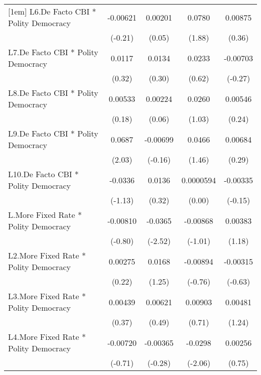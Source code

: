 {\begin{longtable}{l*{4}{c}}
[1em]
L6.De Facto CBI * Polity Democracy& -0.00621         &  0.00201         &   0.0780         &  0.00875         \\
                &  (-0.21)         &   (0.05)         &   (1.88)         &   (0.36)         \\
[1em]
L7.De Facto CBI * Polity Democracy&   0.0117         &   0.0134         &   0.0233         & -0.00703         \\
                &   (0.32)         &   (0.30)         &   (0.62)         &  (-0.27)         \\
[1em]
L8.De Facto CBI * Polity Democracy&  0.00533         &  0.00224         &   0.0260         &  0.00546         \\
                &   (0.18)         &   (0.06)         &   (1.03)         &   (0.24)         \\
[1em]
L9.De Facto CBI * Polity Democracy&   0.0687\sym{*}  & -0.00699         &   0.0466         &  0.00684         \\
                &   (2.03)         &  (-0.16)         &   (1.46)         &   (0.29)         \\
[1em]
L10.De Facto CBI * Polity Democracy&  -0.0336         &   0.0136         &0.0000594         & -0.00335         \\
                &  (-1.13)         &   (0.32)         &   (0.00)         &  (-0.15)         \\
[1em]
L.More Fixed Rate * Polity Democracy& -0.00810         &  -0.0365\sym{*}  & -0.00868         &  0.00383         \\
                &  (-0.80)         &  (-2.52)         &  (-1.01)         &   (1.18)         \\
[1em]
L2.More Fixed Rate * Polity Democracy&  0.00275         &   0.0168         & -0.00894         & -0.00315         \\
                &   (0.22)         &   (1.25)         &  (-0.76)         &  (-0.63)         \\
[1em]
L3.More Fixed Rate * Polity Democracy&  0.00439         &  0.00621         &  0.00903         &  0.00481         \\
                &   (0.37)         &   (0.49)         &   (0.71)         &   (1.24)         \\
[1em]
L4.More Fixed Rate * Polity Democracy& -0.00720         & -0.00365         &  -0.0298\sym{*}  &  0.00256         \\
                &  (-0.71)         &  (-0.28)         &  (-2.06)         &   (0.75)         \\

\end{longtable}}
